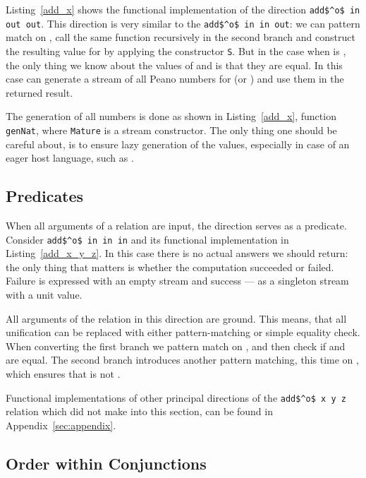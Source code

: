 Listing~\ref{add_x} shows the functional implementation of the direction \lstinline{add$^o$ in out out}.
This direction is very similar to the \lstinline{add$^o$ in in out}: we can pattern match on \x, call the same function recursively in the second \conde branch and construct the resulting value for \z by applying the constructor \lstinline{S}.
But in the case when \x is \zero, the only thing we know about the values of \y and \z is that they are equal.
In this case can generate a stream of all Peano numbers for \z (or \y) and use them in the returned result.

The generation of all numbers is done as shown in Listing~\ref{add_x}, function \lstinline{genNat}, where \lstinline{Mature} is a stream constructor.
The only thing one should be careful about, is to ensure lazy generation of the values, especially in case of an eager host language, such as \ocaml.



\subsection{Predicates}



When all arguments of a relation are input, the direction serves as a predicate.
Consider \lstinline{add$^o$ in in in} and its functional implementation in Listing~\ref{add_x_y_z}.
In this case there is no actual answers we should return: the only thing that matters is whether the computation succeeded or failed.
Failure is expressed with an empty stream and success --- as a singleton stream with a unit value.

All arguments of the relation in this direction are ground.
This means, that all unification can be replaced with either pattern-matching or simple equality check.
When converting the first \conde branch we pattern match on \x, and then check if \y and \z are equal.
The second \conde branch introduces another pattern matching, this time on \z, which ensures that \z is not \zero.

Functional implementations of other principal directions of the \lstinline{add$^o$ x y z} relation which did not make into this section, can be found in Appendix~\ref{sec:appendix}.





\subsection{Order within Conjunctions}

